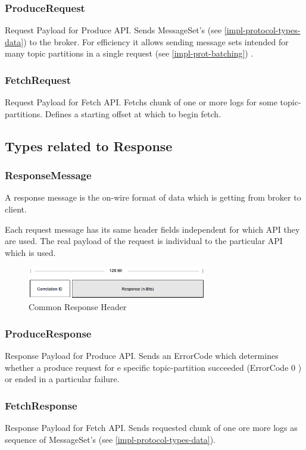 \subsubsection{ProduceRequest}
Request Payload for Produce API. Sends MessageSet's (see 
\ref{impl-protocol-types-data}) to the broker. For efficiency it allows sending
message sets intended for many topic partitions in a single request (see
\ref{impl-prot-batching}) .

\subsubsection{FetchRequest}
Request Payload for Fetch API. Fetchs chunk of one or more logs for some
topic-partitions. Defines a starting offset at which to begin fetch. 

\subsection{Types related to Response}
\subsubsection{ResponseMessage}
A response message is the on-wire format of data which is getting from broker to
client.

Each request message has its same header fields independent for which API they are used. 
The real payload of the request is individual to the particular API which is
used.

\begin{figure}[H]
    \centering
    \includegraphics[width=0.7\textwidth]{images/protocol-response-header.png}
    \caption{Common Response Header}
    \label{fig:protocol-response-header.png}
\end{figure}

\subsubsection{ProduceResponse}
Response Payload for Produce API. Sends an ErrorCode which determines whether a
produce request for e specific topic-partition succeeded (ErrorCode 0 ) or ended
in a particular failure. 

\subsubsection{FetchResponse}
Response Payload for Fetch API. Sends requested chunk of one ore more logs as
sequence of MessageSet's (see \ref{impl-protocol-types-data}). 

